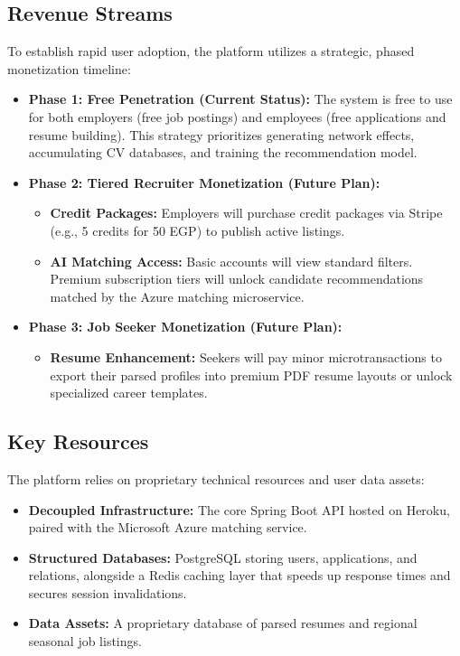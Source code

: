 \documentclass[12pt, a4paper]{report}
\begin{document}
\subsection{Revenue Streams}
To establish rapid user adoption, the platform utilizes a strategic, phased monetization timeline:
\begin{itemize}
    \item \textbf{Phase 1: Free Penetration (Current Status):} The system is free to use for both employers (free job postings) and employees (free applications and resume building). This strategy prioritizes generating network effects, accumulating CV databases, and training the recommendation model.
    \item \textbf{Phase 2: Tiered Recruiter Monetization (Future Plan):}
    \begin{itemize}
        \item \textbf{Credit Packages:} Employers will purchase credit packages via Stripe (e.g., 5 credits for 50 EGP) to publish active listings.
        \item \textbf{AI Matching Access:} Basic accounts will view standard filters. Premium subscription tiers will unlock candidate recommendations matched by the Azure matching microservice.
    \end{itemize}
    \item \textbf{Phase 3: Job Seeker Monetization (Future Plan):}
    \begin{itemize}
        \item \textbf{Resume Enhancement:} Seekers will pay minor microtransactions to export their parsed profiles into premium PDF resume layouts or unlock specialized career templates.
    \end{itemize}
\end{itemize}

\subsection{Key Resources}
The platform relies on proprietary technical resources and user data assets:
\begin{itemize}
    \item \textbf{Decoupled Infrastructure:} The core Spring Boot API hosted on Heroku, paired with the Microsoft Azure matching service.
    \item \textbf{Structured Databases:} PostgreSQL storing users, applications, and relations, alongside a Redis caching layer that speeds up response times and secures session invalidations.
    \item \textbf{Data Assets:} A proprietary database of parsed resumes and regional seasonal job listings.
\end{itemize}
\end{document}

